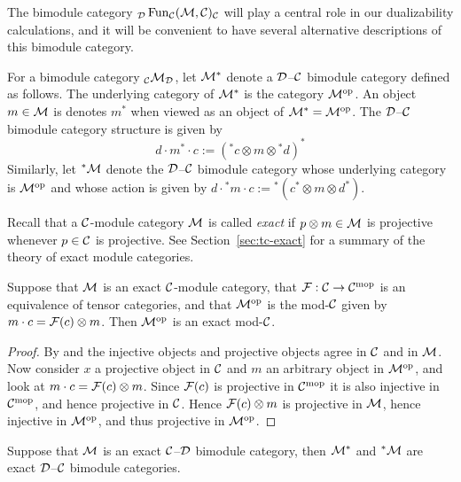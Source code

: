 \documentclass{amsart}
\begin{document}
The bimodule category ${}_\mathcal D \operatorname{Fun}_\mathcal C(\mathcal M,\mathcal C)_\mathcal C$ will play a central role in our dualizability calculations, and it will be convenient to have several alternative descriptions of this bimodule category.

\begin{definition} \label{def:Dual_bimodule_notation}
For a bimodule category ${}_\mathcal C \mathcal M_\mathcal D$, let $\mathcal M^*$ denote a $\mathcal D$--$\mathcal C$ bimodule category defined as follows.  The underlying category of $\mathcal M^*$ is the category $\mathcal M^{\mathrm{op}}$. An object $m \in \mathcal M$ is denotes $m^*$ when viewed as an object of $\mathcal M^* = \mathcal M^{\mathrm{op}}$.  The $\mathcal D$--$\mathcal C$ bimodule category structure is given by
\begin{equation*}
	d\cdot m^* \cdot c := ({}^*c \otimes m \otimes {}^*d)^*
\end{equation*}
Similarly, let ${}^*\mathcal M$ denote the $\mathcal D$--$\mathcal C$ bimodule category whose underlying category is $\mathcal M^{\mathrm{op}}$ and whose action is given by $d\cdot {}^*m \cdot c := {}^*(c^* \otimes m \otimes d^*)$.  
\end{definition}

Recall that a $\mathcal C$-module category $\mathcal M$ is called {\em exact} if $p \otimes m \in \mathcal M$ is projective whenever $p \in \mathcal C$ is projective.  See Section~\ref{sec:tc-exact} for a summary of the theory of exact module categories.

\begin{lemma}
Suppose that $\mathcal M$ is an exact $\mathcal C$-module category, that $\mathcal F: \mathcal C \rightarrow \mathcal C^{\mathrm{mop}}$ is an equivalence of tensor categories, and that $\mathcal M^{\mathrm{op}}$ is the mod-$\mathcal C$ given by $m \cdot c = \mathcal F(c) \otimes m$.  Then $\mathcal M^{\mathrm{op}}$ is an exact mod-$\mathcal C$.
\end{lemma}
\begin{proof}
By \cite[Prop. 2.3]{EO-ftc} and \cite[Corollary 3.6]{EO-ftc} the injective objects and projective objects agree in $\mathcal C$ and in $\mathcal M$.  Now consider $x$ a projective object in $\mathcal C$ and $m$ an arbitrary object in $\mathcal M^{\mathrm{op}}$, and look at $m \cdot c = \mathcal F(c) \otimes m$.  Since $\mathcal F(c)$ is projective in $\mathcal C^{\mathrm{mop}}$ it is also injective in $\mathcal C^{\mathrm{mop}}$, and hence projective in $\mathcal C$.  Hence $\mathcal F(c) \otimes m$ is projective in $\mathcal M$, hence injective in $\mathcal M^{\mathrm{op}}$, and thus projective in $\mathcal M^{\mathrm{op}}$.
\end{proof}

\begin{corollary} \label{cor:adjoint-exactness}
Suppose that $\mathcal M$ is an exact $\mathcal C$--$\mathcal D$ bimodule category, then $\mathcal M^*$ and ${}^*\mathcal M$ are exact $\mathcal D$--$\mathcal C$ bimodule categories.
\end{corollary}
\end{document}
